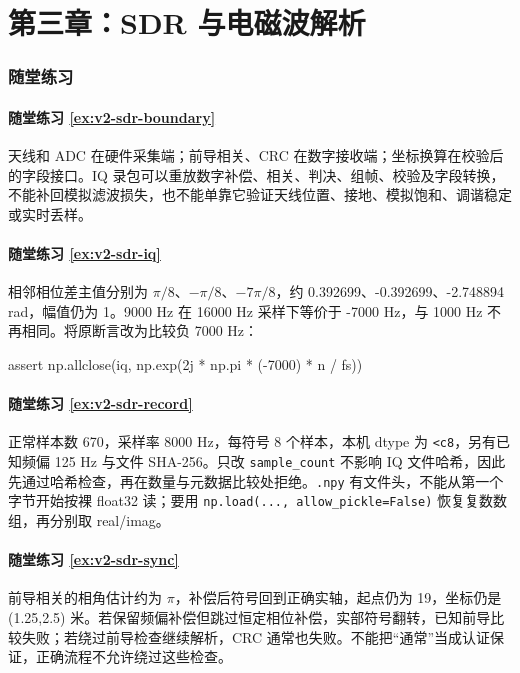 \section*{第三章：SDR 与电磁波解析}
{}
\subsubsection*{随堂练习}

\paragraph*{随堂练习 \ref{ex:v2-sdr-boundary}}
\begin{solution}
天线和 ADC 在硬件采集端；前导相关、CRC 在数字接收端；坐标换算在校验后的字段接口。IQ 录包可以重放数字补偿、相关、判决、组帧、校验及字段转换，不能补回模拟滤波损失，也不能单靠它验证天线位置、接地、模拟饱和、调谐稳定或实时丢样。
\end{solution}

\paragraph*{随堂练习 \ref{ex:v2-sdr-iq}}
\begin{solution}
相邻相位差主值分别为 $\pi/8$、$-\pi/8$、$-7\pi/8$，约 0.392699、-0.392699、-2.748894 rad，幅值仍为 1。9000 Hz 在 16000 Hz 采样下等价于 -7000 Hz，与 1000 Hz 不再相同。将原断言改为比较负 7000 Hz：
\begin{tpython}
assert np.allclose(iq, np.exp(2j * np.pi * (-7000) * n / fs))
\end{tpython}
\end{solution}

\paragraph*{随堂练习 \ref{ex:v2-sdr-record}}
\begin{solution}
正常样本数 670，采样率 8000 Hz，每符号 8 个样本，本机 dtype 为 \texttt{<c8}，另有已知频偏 125 Hz 与文件 SHA-256。只改 \texttt{sample\_count} 不影响 IQ 文件哈希，因此先通过哈希检查，再在数量与元数据比较处拒绝。\texttt{.npy} 有文件头，不能从第一个字节开始按裸 float32 读；要用 \texttt{np.load(..., allow\_pickle=False)} 恢复复数数组，再分别取 real/imag。
\end{solution}

\paragraph*{随堂练习 \ref{ex:v2-sdr-sync}}
\begin{solution}
前导相关的相角估计约为 $\pi$，补偿后符号回到正确实轴，起点仍为 19，坐标仍是 (1.25,2.5) 米。若保留频偏补偿但跳过恒定相位补偿，实部符号翻转，已知前导比较失败；若绕过前导检查继续解析，CRC 通常也失败。不能把“通常”当成认证保证，正确流程不允许绕过这些检查。
\end{solution}

